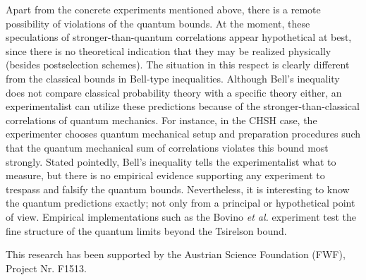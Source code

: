 Apart from the concrete experiments mentioned above,
there is a remote possibility of violations of the quantum bounds.
At the moment, these speculations of stronger-than-quantum correlations
\cite{pop-rohr,mermin-1995,svozil-krenn} appear
hypothetical at best, since there is no theoretical indication
that they may be realized physically (besides postselection schemes).
The situation in this respect is clearly different
from the classical bounds in Bell-type inequalities.
Although Bell's inequality does not compare classical probability theory
with a specific theory either, an experimentalist
can utilize these predictions because of
the stronger-than-classical correlations of quantum mechanics.
For instance, in the CHSH case, the experimenter chooses
quantum mechanical setup and preparation procedures such that
the quantum mechanical sum of correlations  violates this bound
most strongly.  Stated pointedly,
Bell's inequality tells the experimentalist what to
measure, but there is no empirical evidence supporting
any experiment to trespass and falsify the quantum bounds.
Nevertheless, it is interesting to know the quantum predictions exactly;
not only from a principal or hypothetical point of view.
Empirical implementations such as the Bovino {\it et al.}
\cite{bovino-2003} experiment test the fine structure of the quantum limits
beyond the  Tsirelson bound.

This research has been supported by the Austrian Science Foundation (FWF), Project Nr. F1513.



%
%
%
%

